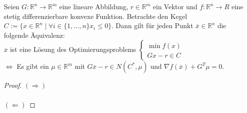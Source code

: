 
Seien $G:\mathbb R^n\to\mathbb R^m$ eine lineare Abbildung, $r\in\mathbb R^m$ ein Vektor und $f: \mathbb R^n\to R$ eine stetig differenzierbare konvexe Funktion. Betrachte den Kegel $C:=\{x\in\mathbb R^n\mid\forall  i\in\{1,...,n\} x_i\leq 0\}$. Dann gilt für jeden Punkt $\overline x\in\mathbb R^n$ die folgende Äquivalenz:\\ $\overline x$ ist eine Lösung des Optimierungsproblems $\begin{cases}\min f(x)\\Gx-r\in C\end{cases}$\\
$\Leftrightarrow$ Es gibt ein $\mu\in\mathbb R^m$ mit $G\overline x-r\in N(C^*,\mu)$ und $\nabla f(\overline x)+G^T\mu=0$.
\begin{proof}
$(\Rightarrow)$\\\\
$(\Leftarrow)$
\end{proof}